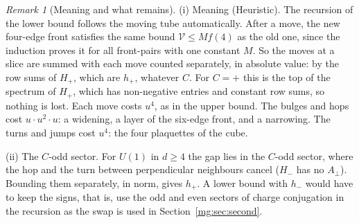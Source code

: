 \documentclass[11pt,a4paper]{article}
\theoremstyle{definition}
\theoremstyle{remark}
\newtheorem{remark}[theorem]{Remark}
\begin{document}
\begin{remark}[Meaning and what remains]\label{mg:rem:fourthlower}
(i) Meaning (Heuristic). The recursion of the lower bound follows the moving tube automatically. After a move, the new four-edge front satisfies the same bound
$\mathcal V\le Mf(4)$ as the old one, since the induction proves it for all front-pairs with one constant $M$. So the moves at a slice are summed with each move
counted separately, in absolute value: by the row sums of $H_+$, which are $h_+$, whatever $C$. For $C=+$ this is the top of the spectrum of $H_+$, which has
non-negative entries and constant row sums, so nothing is lost. Each move costs $u^4$, as in the upper bound. The bulges and
hops cost $u\cdot u^2\cdot u$: a widening, a layer of the six-edge front, and a narrowing. The turns and jumps cost $u^4$: the four plaquettes of the cube.

(ii) The $C$-odd sector. For $U(1)$ in $d\ge4$ the gap lies in the $C$-odd sector, where the hop and the turn between perpendicular neighbours cancel ($H_-$ has no
$A_\perp$). Bounding them separately, in norm, gives $h_+$. A lower bound with $h_-$ would have to keep the signs, that is, use the odd and even sectors of charge
conjugation in the recursion as the swap is used in Section~\ref{mg:sec:second}.


\end{remark}
\end{document}
